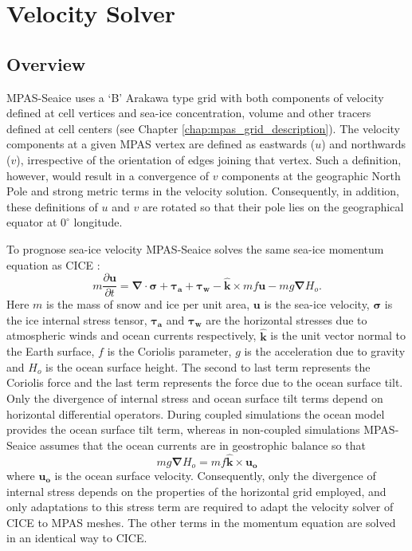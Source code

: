 \section{Velocity Solver}
\label{sec:velocity_solver}

\subsection{Overview}

MPAS-Seaice uses a `B' Arakawa type grid \citep{Arakawa77} with both components of velocity defined at cell vertices and sea-ice concentration, volume and other tracers defined at cell centers (see Chapter \ref{chap:mpas_grid_description}). The velocity components at a given MPAS vertex are defined as eastwards ($u$) and northwards ($v$), irrespective of the orientation of edges joining that vertex. Such a definition, however, would result in a convergence of $v$ components at the geographic North Pole and strong metric terms in the velocity solution. Consequently, in addition, these definitions of $u$ and $v$ are rotated so that their pole lies on the geographical equator at $0^\circ$ longitude. 

To prognose sea-ice velocity MPAS-Seaice solves the same sea-ice momentum equation as CICE \citep{Hibler79,Hunke97}:
\begin{equation}
m \frac{\partial{\boldsymbol{u}}}{\partial{t}} = \boldsymbol{\nabla} \cdot \boldsymbol{\sigma} + \boldsymbol{\tau_a} + \boldsymbol{\tau_w} - \boldsymbol{\hat{k}} \times m f \boldsymbol{u} -mg \boldsymbol{\nabla}H_o.
\end{equation}
Here $m$ is the mass of snow and ice per unit area, $\boldsymbol{u}$ is the sea-ice velocity, $\boldsymbol{\sigma}$ is the ice internal stress tensor, $\boldsymbol{\tau_a}$ and $\boldsymbol{\tau_w}$ are the horizontal stresses due to atmospheric winds and ocean currents respectively, $\boldsymbol{\hat{k}}$ is the unit vector normal to the Earth surface, $f$ is the Coriolis parameter, $g$ is the acceleration due to gravity and $H_o$ is the ocean surface height. The second to last term represents the Coriolis force and the last term represents the force due to the ocean surface tilt. Only the divergence of internal stress and ocean surface tilt terms depend on horizontal differential operators. During coupled simulations the ocean model provides the ocean surface tilt term, whereas in non-coupled simulations MPAS-Seaice assumes that the ocean currents are in geostrophic balance so that
\begin{equation}
mg \boldsymbol{\nabla}H_o = m f \boldsymbol{\hat{k}} \times \boldsymbol{u_o}
\end{equation}
where $\boldsymbol{u_o}$ is the ocean surface velocity. Consequently, only the divergence of internal stress depends on the properties of the horizontal grid employed, and only adaptations to this stress term are required to adapt the velocity solver of CICE to MPAS meshes. The other terms in the momentum equation are solved in an identical way to CICE.

